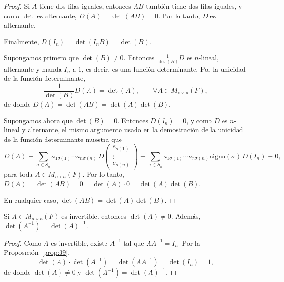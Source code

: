 \documentclass[12pt,a4paper]{book}
\begin{document}
\begin{proof}
        Si $A$ tiene dos filas iguales, entonces $AB$ también tiene dos filas iguales, y como $\det$ es alternante, $D(A) = \det(AB) = 0$. Por lo tanto, $D$ es alternante.

        Finalmente, $D(I_{n}) = \det(I_{n} B) = \det(B)$.

        Supongamos primero que $\det(B) \neq 0$. Entonces $\tfrac{1}{\det(B)} D$ es $n$-lineal, alternante y manda $I_{n}$ a $1$, es decir, es una función determinante. Por la unicidad de la función determinante,
        \begin{equation*}
            \frac{1}{\det(B)} D(A) = \det(A), \qquad \forall A \in M_{n \times n}(F),
        \end{equation*}
        de donde $D(A) = \det(AB) = \det(A)\det(B)$.

        Supongamos ahora que $\det(B) = 0$. Entonces $D(I_{n}) = 0$, y como $D$ es $n$-lineal y alternante, el mismo argumento usado en la demostración de la unicidad de la función determinante muestra que
        \begin{equation*}
            D(A) = \sum_{\sigma \in S_{n}} a_{1\sigma(1)} \cdots a_{n\sigma(n)} \, D
            \begin{pmatrix}
                e_{\sigma(1)} \\
                \vdots \\
                e_{\sigma(n)}
            \end{pmatrix}
            = \sum_{\sigma \in S_{n}} a_{1\sigma(1)} \cdots a_{n\sigma(n)} \, \text{signo}(\sigma) \, D(I_{n}) = 0,
        \end{equation*}
        para toda $A \in M_{n \times n}(F)$. Por lo tanto, $D(A) = \det(AB) = 0 = \det(A) \cdot 0 = \det(A)\det(B)$.

        En cualquier caso, $\det(AB) = \det(A)\det(B)$.
    \end{proof}

    \begin{corolario}
    \label{coro:7}
        Si $A \in M_{n \times n}(F)$ es invertible, entonces $\det(A) \neq 0$. Además, $\det(A^{-1}) = \det(A)^{-1}$.
    \end{corolario}

    \begin{proof}
        Como $A$ es invertible, existe $A^{-1}$ tal que $AA^{-1} = I_{n}$. Por la Proposición~\ref{prop:39},
        \begin{equation*}
            \det(A) \cdot \det(A^{-1}) = \det(AA^{-1}) = \det(I_{n}) = 1,
        \end{equation*}
        de donde $\det(A) \neq 0$ y $\det(A^{-1}) = \det(A)^{-1}$.
    \end{proof}
\end{document}
